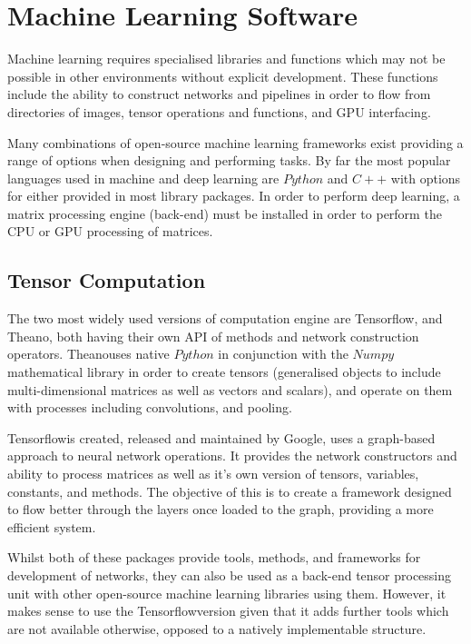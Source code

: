 \documentclass[fleqn,twoside,12pt]{report}
\begin{document}
\section{Machine Learning Software}


Machine learning requires specialised libraries and functions which may not be possible in other environments without explicit development. These functions include the ability to construct networks and pipelines in order to flow from directories of images, tensor operations and functions, and GPU interfacing.  

Many combinations of open-source machine learning frameworks exist providing a range of options when designing and performing tasks. By far the most popular languages used in machine and deep learning are $Python$ and $C++$ with options for either provided in most library packages. In order to perform deep learning, a matrix processing engine (back-end) must be installed in order to perform the CPU or GPU processing of matrices.





\subsection{Tensor Computation}

The two most widely used versions of computation engine are Tensorflow\textregistered, and Theano\textregistered, both having their own API of methods and network construction operators. Theano\textregistered uses native $Python$ in conjunction with the $Numpy$ mathematical library in order to create tensors (generalised objects to include multi-dimensional matrices as well as vectors and scalars), and operate on them with processes including convolutions, and pooling.  

Tensorflow\textregistered is created, released and maintained by Google\textregistered, uses a graph-based approach to neural network operations. It provides the network constructors and ability to process matrices as well as it's own version of tensors, variables, constants, and methods. The objective of this is to create a framework designed to flow better through the layers once loaded to the graph, providing a more efficient system. 

Whilst both of these packages provide tools, methods, and frameworks for development of networks, they can also be used as a back-end tensor processing unit with other open-source machine learning libraries using them. However, it makes sense to use the Tensorflow\textregistered version given that it adds further tools which are not available otherwise, opposed to a natively implementable structure.
\end{document}
